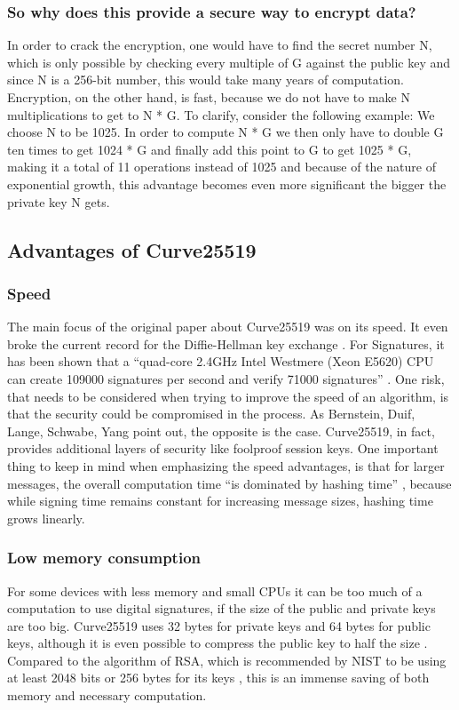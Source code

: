 \subsubsection{So why does this provide a secure way to encrypt data?}
In order to crack the encryption, one would have to find the secret number N, which is only possible by checking every multiple of G against the public key and since N is a 256-bit number, this would take many years of computation.
Encryption, on the other hand, is fast, because we do not have to make N multiplications to get to N * G. To clarify, consider the following example:
We choose N to be 1025. In order to compute N * G we then only have to double G ten times to get 1024 * G and finally add this point to G to get 1025 * G, making it a total of 11 operations instead of 1025 and because of the nature of exponential growth, this advantage becomes even more significant the bigger the private key N gets.

\subsection{Advantages of Curve25519}
\subsubsection{Speed}
The main focus of the original paper about Curve25519 was on its speed. It even broke the current record for the Diffie-Hellman key exchange \cite{ECDH}. For Signatures, it has been shown that a ``quad-core 2.4GHz Intel Westmere (Xeon E5620) CPU can create 109000 signatures per second and verify 71000 signatures'' \cite{Curve25519}. One risk, that needs to be considered when trying to improve the speed of an algorithm, is that the security could be compromised in the process. As Bernstein, Duif, Lange, Schwabe, Yang \cite{Curve25519} point out, the opposite is the case. Curve25519, in fact, provides additional layers of security like foolproof session keys. One important thing to keep in mind when emphasizing the speed advantages, is that for larger messages, the overall computation time “is dominated by hashing time” \cite{Curve25519}, because while signing time remains constant for increasing message sizes, hashing time grows linearly. 

\subsubsection{Low memory consumption}
For some devices with less memory and small CPUs it can be too much of a computation to use digital signatures, if the size of the public and private keys are too big. Curve25519 uses 32 bytes for private keys and 64 bytes for public keys, although it is even possible to compress the public key to half the size \cite{ECDH}. Compared to the algorithm of RSA, which is recommended by NIST to be using at least 2048 bits or 256 bytes for its keys \cite{NistKeyMan}, this is an immense saving of both memory and necessary computation.

